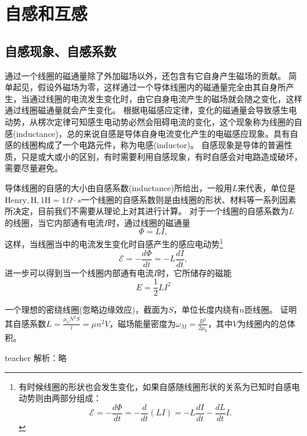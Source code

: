  \section{自感和互感}
 \subsection{自感现象、自感系数}

通过一个线圈的磁通量除了外加磁场以外，还包含有它自身产生磁场的贡献。
简单起见，假设外磁场为零，这样通过一个导体线圈内的磁通量完全由其自身所产生，当通过线圈的电流发生变化时，由它自身电流产生的磁场就会随之变化，这样通过线圈磁通量就会产生变化。
根据电磁感应定律，变化的磁通量会导致感生电动势，从楞次定律可知感生电动势必然会阻碍电流的变化，这个现象称为线圈的{\heiti 自感}(inductance)，总的来说自感是导体自身电流变化产生的电磁感应现象。具有自感的线圈构成了一个电路元件，称为{\heiti 电感}(inductor)。
自感现象是导体的普遍性质，只是或大或小的区别，有时需要利用自感现象，有时自感会对电路造成破坏，需要尽量避免。

导体线圈的自感的大小由{\heiti 自感系数}(inductance)所给出，一般用$L$来代表，单位是$\mathrm{Henry}, \mathrm{H}, 1\mathrm{H} = 1 \Omega \cdot s$一个线圈的自感系数则是由线圈的形状、材料等一系列因素所决定，目前我们不需要从理论上对其进行计算。
对于一个线圈的自感系数为$L$的线圈，当它内部通有电流$I$时，通过线圈的磁通量
\begin{equation}
\Phi = LI,
\end{equation}
这样，当线圈当中的电流发生变化时自感产生的感应电动势\footnote{有时候线圈的形状也会发生变化，如果自感随线圈形状的关系为已知时自感电动势则由两部分组成：\[\mathcal{E} = -\frac{d\Phi}{dt} = -\frac{d}{dt}(LI) = -L\frac{dI}{dt}-\frac{dL}{dt}I.\]}
\begin{equation}
\mathcal{E} = -\frac{d\Phi}{dt} = -L\frac{dI}{dt},
\end{equation}
进一步可以得到当一个线圈内部通有电流$I$时，它所储存的磁能
\begin{equation}
E = \frac{1}{2}LI^2
\end{equation}


\begin{example}
一个理想的密绕线圈(忽略边缘效应)，截面为$S$，单位长度内绕有$n$匝线圈。
证明其自感系数$L = \frac{\mu_0 N^2 S}{l} = \mu n^2 V$，磁场能量密度为$\omega_M = \frac{B^2}{2\mu_0}$，其中$V$为线圈内的总体积。
\begin{taggedblock}{teacher}
\newline
解析：略
\end{taggedblock}
\end{example}

